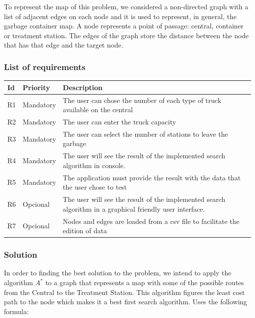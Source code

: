 \documentclass[a4paper]{article}
\begin{document}
To represent the map of this problem, we considered a non-directed graph with a list of adjacent edges on each node and it is used to represent, in general, the garbage container map. A node represents a point of passage: central, container or treatment station. The edges of the graph store the distance between the node that has that edge and the target node.

\subsubsection{List of requirements}\label{subsecsec:requirements}

\begin{table}[H]
	\centering
	\label{tab:list-of-requirements}
	\begin{tabular}{|l|l|p{9cm}|}
		\hline
		\textbf{Id} & \textbf{Priority} & \textbf{Description} \\ \hline
		R1 & Mandatory        & The user can chose the number of each type of truck available on the central  \\ \hline
		R2 & Mandatory         & The user can enter the truck capacity \\ \hline
		R3 & Mandatory          & The user can select the number of stations to leave the garbage \\ \hline
		R4 & Mandatory         & The user will see the result of the implemented search algorithm in console. \\ \hline
		R5 & Mandatory         & The application must provide the result with the data that the user chose to test \\ \hline
		R6 & Opcional         & The user will see the result of the implemented search algorithm in a graphical friendly user interface.\\ \hline
		R7 & Opcional         & Nodes and edges are loaded from a csv file to facilitate the edition of data \\ \hline
	\end{tabular}
\end{table}

\subsubsection{Solution}\label{solution}

In order to finding the best solution to the problem, we intend to apply the algorithm $A^*$ to a graph that represents a map with some of the possible routes from the Central to the Treatment Station. This algorithm figures the least cost path to the node which makes it a best first search algorithm. Uses the following formula:
\end{document}
